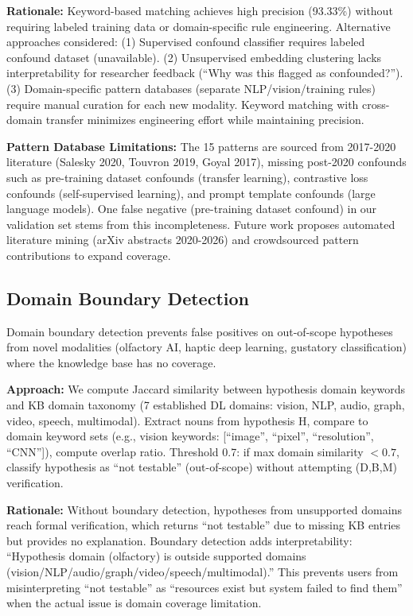 \textbf{Rationale:} Keyword-based matching achieves high precision (93.33\%) without requiring labeled training data or domain-specific rule engineering. Alternative approaches considered: (1) Supervised confound classifier requires labeled confound dataset (unavailable). (2) Unsupervised embedding clustering lacks interpretability for researcher feedback (``Why was this flagged as confounded?''). (3) Domain-specific pattern databases (separate NLP/vision/training rules) require manual curation for each new modality. Keyword matching with cross-domain transfer minimizes engineering effort while maintaining precision.

\textbf{Pattern Database Limitations:} The 15 patterns are sourced from 2017-2020 literature (Salesky 2020, Touvron 2019, Goyal 2017), missing post-2020 confounds such as pre-training dataset confounds (transfer learning), contrastive loss confounds (self-supervised learning), and prompt template confounds (large language models). One false negative (pre-training dataset confound) in our validation set stems from this incompleteness. Future work proposes automated literature mining (arXiv abstracts 2020-2026) and crowdsourced pattern contributions to expand coverage.

\subsection{Domain Boundary Detection}

Domain boundary detection prevents false positives on out-of-scope hypotheses from novel modalities (olfactory AI, haptic deep learning, gustatory classification) where the knowledge base has no coverage.

\textbf{Approach:} We compute Jaccard similarity between hypothesis domain keywords and KB domain taxonomy (7 established DL domains: vision, NLP, audio, graph, video, speech, multimodal). Extract nouns from hypothesis H, compare to domain keyword sets (e.g., vision keywords: [``image'', ``pixel'', ``resolution'', ``CNN'']), compute overlap ratio. Threshold 0.7: if max domain similarity $< 0.7$, classify hypothesis as ``not testable'' (out-of-scope) without attempting (D,B,M) verification.

\textbf{Rationale:} Without boundary detection, hypotheses from unsupported domains reach formal verification, which returns ``not testable'' due to missing KB entries but provides no explanation. Boundary detection adds interpretability: ``Hypothesis domain (olfactory) is outside supported domains (vision/NLP/audio/graph/video/speech/multimodal).'' This prevents users from misinterpreting ``not testable'' as ``resources exist but system failed to find them'' when the actual issue is domain coverage limitation.

